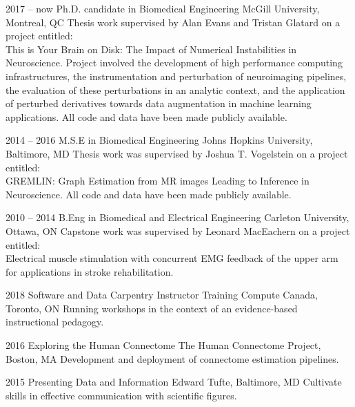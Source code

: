 \documentclass[]{friggeri-cv} %
\begin{document}
\begin{entrylist}


\entry
{2017 -- now}
{Ph.D. candidate {\normalfont in Biomedical Engineering}}
{McGill University, Montreal, QC}
{Thesis work supervised by Alan Evans and Tristan Glatard on a project entitled:\\ This is Your Brain on Disk: The
Impact of Numerical Instabilities in Neuroscience. Project involved the development of high performance computing
infrastructures, the instrumentation and perturbation of neuroimaging pipelines, the evaluation of these perturbations
in an analytic context, and the application of perturbed derivatives towards data augmentation in machine learning
applications. All code and data have been made publicly available.}


\entry
{2014 -- 2016}
{M.S.E {\normalfont in Biomedical Engineering}}
{Johns Hopkins University, Baltimore, MD}
{Thesis work was supervised by Joshua T. Vogelstein on a project entitled:\\GREMLIN:
Graph Estimation from MR images Leading to Inference in Neuroscience. All code and data have
been made publicly available.}


\entry
{2010 -- 2014}
{B.Eng {\normalfont in Biomedical and Electrical Engineering}}
{Carleton University, Ottawa, ON}
{Capstone work was supervised by Leonard MacEachern on a project entitled:\\Electrical
muscle stimulation with concurrent EMG feedback of the upper arm for applications in stroke
rehabilitation.}


\entry
{2018}
{Software and Data Carpentry Instructor Training}
{Compute Canada, Toronto, ON}
{Running workshops in the context of an evidence-based instructional pedagogy.}


\entry
{2016}
{Exploring the Human Connectome}
{The Human Connectome Project, Boston, MA}
{Development and deployment of connectome estimation pipelines.}


\entry
{2015}
{Presenting Data and Information}
{Edward Tufte, Baltimore, MD}
{Cultivate skills in effective communication with scientific figures.}

\end{entrylist}
\end{document}
